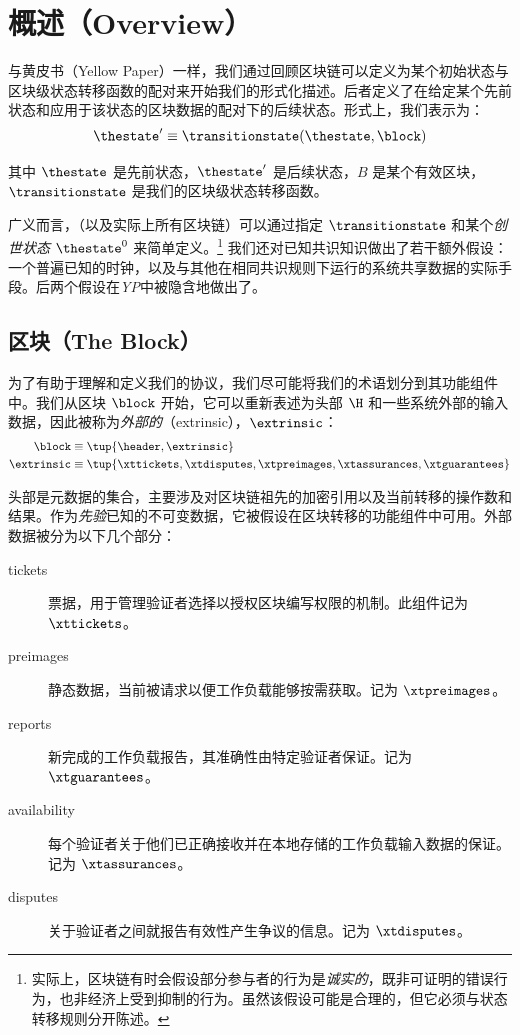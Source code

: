 \section{概述（Overview）}\label{sec:overview}

与黄皮书（Yellow Paper）一样，我们通过回顾区块链可以定义为某个初始状态与区块级状态转移函数的配对来开始我们的形式化描述。后者定义了在给定某个先前状态和应用于该状态的区块数据的配对下的后续状态。形式上，我们表示为：
\begin{align}\label{eq:statetransition}
\thestate' \equiv \transitionstate(\thestate, \block)
\end{align}

其中 $\thestate$ 是先前状态，$\thestate'$ 是后续状态，$B$ 是某个有效区块，$\transitionstate$ 是我们的区块级状态转移函数。

广义而言，\Jam（以及实际上所有区块链）可以通过指定 $\transitionstate$ 和某个\emph{创世状态} $\thestate^0$ 来简单定义。\footnote{实际上，区块链有时会假设部分参与者的行为是\emph{诚实的}，既非可证明的错误行为，也非经济上受到抑制的行为。虽然该假设可能是合理的，但它必须与状态转移规则分开陈述。} 我们还对已知共识知识做出了若干额外假设：一个普遍已知的时钟，以及与其他在相同共识规则下运行的系统共享数据的实际手段。后两个假设在\emph{YP}中被隐含地做出了。

\subsection{区块（The Block）}

为了有助于理解和定义我们的协议，我们尽可能将我们的术语划分到其功能组件中。我们从区块 $\block$ 开始，它可以重新表述为头部 $\H$ 和一些系统外部的输入数据，因此被称为\emph{外部的}（extrinsic），$\extrinsic$：
\begin{align}
  \label{eq:block}\block &\equiv \tup{\header, \extrinsic} \\
  \label{eq:extrinsic}\extrinsic &\equiv \tup{\xttickets, \xtdisputes, \xtpreimages, \xtassurances, \xtguarantees}
\end{align}

头部是元数据的集合，主要涉及对区块链祖先的加密引用以及当前转移的操作数和结果。作为\emph{先验}已知的不可变数据，它被假设在区块转移的功能组件中可用。外部数据被分为以下几个部分：

\begin{description}
  \item[tickets] 票据，用于管理验证者选择以授权区块编写权限的机制。此组件记为 $\xttickets$。
  \item[preimages] 静态数据，当前被请求以便工作负载能够按需获取。记为 $\xtpreimages$。
  \item[reports] 新完成的工作负载报告，其准确性由特定验证者保证。记为 $\xtguarantees$。
  \item[availability] 每个验证者关于他们已正确接收并在本地存储的工作负载输入数据的保证。记为 $\xtassurances$。
  \item[disputes] 关于验证者之间就报告有效性产生争议的信息。记为 $\xtdisputes$。
\end{description}

